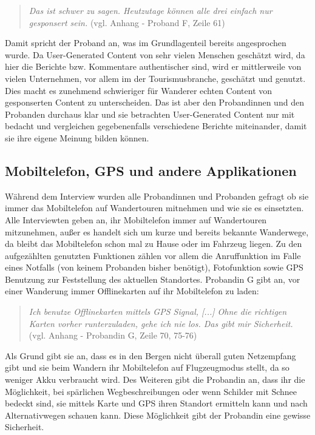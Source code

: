 \begin{quote}
	\textit{\glqq Das ist schwer zu sagen. Heutzutage können alle drei einfach nur gesponsert sein.\grqq} (vgl. Anhang - Proband F, Zeile 61)
\end{quote}

Damit spricht der Proband an, was im Grundlagenteil bereits angesprochen wurde. Da User-Generated Content von sehr vielen Menschen geschätzt wird, da hier die Berichte bzw. Kommentare authentischer sind, wird er mittlerweile von vielen Unternehmen, vor allem im  der Tourismusbranche, geschätzt und genutzt. Dies macht es zunehmend schwieriger für Wanderer \glqq echten{\grqq} Content von gesponserten Content zu unterscheiden. Das ist aber den Probandinnen und den Probanden durchaus klar und sie betrachten User-Generated Content nur mit bedacht und vergleichen gegebenenfalls verschiedene Berichte miteinander, damit sie ihre eigene Meinung bilden können.

\subsection{Mobiltelefon, GPS und andere Applikationen}

Während dem Interview wurden alle Probandinnen und Probanden gefragt ob sie immer das Mobiltelefon auf Wandertouren mitnehmen und wie sie es einsetzten. Alle Interviewten geben an, ihr Mobiltelefon immer auf Wandertouren mitzunehmen, außer es handelt sich um kurze und bereits bekannte Wanderwege, da bleibt das Mobiltelefon schon mal zu Hause oder im Fahrzeug liegen. Zu den aufgezählten genutzten Funktionen zählen vor allem die Anruffunktion im Falle eines Notfalls (von keinem Probanden bisher benötigt), Fotofunktion sowie GPS Benutzung zur Feststellung des aktuellen Standortes. Probandin G gibt an, vor einer Wanderung immer Offlinekarten auf ihr Mobiltelefon zu laden:

\begin{quote}
	\textit{\glqq Ich benutze Offlinekarten mittels GPS Signal, [...] Ohne die richtigen Karten vorher runterzuladen, gehe ich nie los. Das gibt mir Sicherheit.\grqq} (vgl. Anhang - Probandin G, Zeile 70, 75-76)
\end{quote}

Als Grund gibt sie an, dass es in den Bergen nicht überall guten Netzempfang gibt und sie beim Wandern ihr Mobiltelefon auf Flugzeugmodus stellt, da so weniger Akku verbraucht wird. Des Weiteren gibt die Probandin an, dass ihr die Möglichkeit, bei spärlichen Wegbeschreibungen oder wenn Schilder mit Schnee bedeckt sind, sie mittels Karte und GPS ihren Standort ermitteln kann und nach Alternativwegen schauen kann. Diese Möglichkeit gibt der Probandin eine gewisse Sicherheit.

